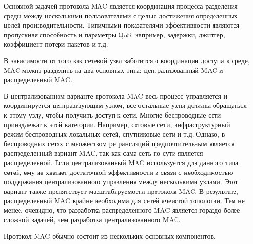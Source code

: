 \documentclass[14pt,a4paper,titlepage]{extarticle}
\begin{document}
Основной задачей протокола MAC является координация процесса разделения среды между несколькими пользователями с целью достижения определенных целей производительности. Типичными показателями эффективности являются пропускная способность и параметры QoS: например, задержки, джиттер, коэффициент потери пакетов и т.д.

В зависимости от того как сетевой узел заботится о координации доступа к среде, MAC можно разделить на два основных типа: централизованный MAC и распределенный MAC.

В централизованном варианте протокола MAC весь процесс управляется и координируется центразизующим узлом, все остальные узлы должны обращаться к этому узлу, чтобы получить доступ к сети. Многие беспроводные сети принадлежат к этой категории. Например, сотовые сети, инфраструктурный режим беспроводных локальных сетей, спутниковые сети и т.д. Однако, в беспроводных сетях с множеством ретрансляций предпочтительным является  распределенный вариант MAC, так как сама сеть по сути является распределенной. Если централизованный MAC используется для данного типа сетей, ему не хватает достаточной эффективности в связи с необходимостью поддержания централизованного управления между несколькими узлами. Этот вариант также препятствует масштабируемости протокола MAC. В результате, распределенный MAC крайне необходима для сетей ячеистой топологии. Тем не менее, очевидно, что разработка распределенного MAC является гораздо более сложной задачей, чем разработка централизованного MAC.

Протокол MAC обычно состоит из нескольких основных компонентов.
\end{document}
